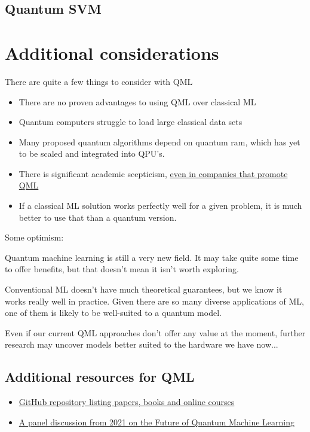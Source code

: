 \documentclass{book}
\begin{document}
\subsection{Quantum SVM} 

\section{Additional considerations}

There are quite a few things to consider with QML 
\begin{itemize}
    \item There are no proven advantages to using QML over classical ML 
    \item Quantum computers struggle to load large classical data sets 
    \item Many proposed quantum algorithms depend on quantum ram, which has yet to be scaled and integrated into QPU's. 
    \item There is significant academic scepticism, \href{https://www.youtube.com/watch?v=5UsJV2BNj2U&list=PLOFEBzvs-VvppIb0jg5_aDbmFs36DXD9w}{even in companies that promote QML}
    \item If a classical ML solution works perfectly well for a given problem, it is much better to use that than a quantum version. 
\end{itemize}


Some optimism: 

Quantum machine learning is still a very new field. It may take quite some time to offer benefits, but that doesn't mean it isn't worth exploring.

Conventional ML doesn't have much theoretical guarantees, but we know it works really well in practice. Given there are so many diverse applications of ML, one of them is likely to be well-suited to a quantum model.

Even if our current QML approaches don't offer any value at the moment, further research may uncover models better suited to the hardware we have now...

\subsection{Additional resources for QML}
\begin{itemize}
    \item \href{https://github.com/Christophe-pere/Roadmap-to-QML}{GitHub repository listing papers, books and online courses}
    \item \href{https://www.youtube.com/watch?v=5UsJV2BNj2U&list=PLOFEBzvs-VvppIb0jg5_aDbmFs36DXD9w}{A panel discussion from 2021 on the Future of Quantum Machine Learning}
\end{itemize}
\end{document}
